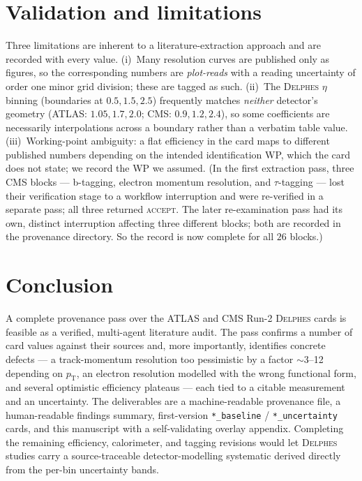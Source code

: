 \documentclass[11pt,a4paper]{article}
\begin{document}
\section{Validation and limitations}
Three limitations are inherent to a literature-extraction approach and are
recorded with every value. (i)~Many resolution curves are published only as
figures, so the corresponding numbers are \emph{plot-reads} with a
reading uncertainty of order one minor grid division; these are tagged as such.
(ii)~The \textsc{Delphes} $\eta$ binning (boundaries at $0.5,1.5,2.5$) frequently
matches \emph{neither} detector's geometry (ATLAS: $1.05,1.7,2.0$; CMS:
$0.9,1.2,2.4$), so some coefficients are necessarily interpolations across a
boundary rather than a verbatim table value. (iii)~Working-point ambiguity: a
flat efficiency in the card maps to different published numbers depending on the
intended identification WP, which the card does not state; we record the WP we
assumed. (In the first extraction pass, three CMS blocks --- b-tagging, electron
momentum resolution, and $\tau$-tagging --- lost their verification stage to a
workflow interruption and were re-verified in a separate pass; all three returned
\textsc{accept}. The later re-examination pass had its own, distinct interruption
affecting three different blocks; both are recorded in the provenance directory. So the
record is now complete for all $26$ blocks.)

\section{Conclusion}
A complete provenance pass over the ATLAS and CMS Run-2 \textsc{Delphes} cards is
feasible as a verified, multi-agent literature audit. The pass confirms a number
of card values against their sources and, more importantly, identifies concrete
defects --- a track-momentum resolution too pessimistic by a factor $\sim$3--12
depending on $p_\mathrm{T}$, an electron resolution modelled with the wrong
functional form, and several optimistic efficiency plateaus --- each tied to a
citable measurement and an uncertainty. The deliverables are a machine-readable
provenance file, a human-readable findings summary, first-version
\texttt{*\_baseline} / \texttt{*\_uncertainty} cards, and this manuscript with a
self-validating overlay appendix. Completing the remaining efficiency, calorimeter,
and tagging revisions would let \textsc{Delphes} studies carry a source-traceable
detector-modelling systematic derived directly from the per-bin uncertainty bands.
\end{document}
